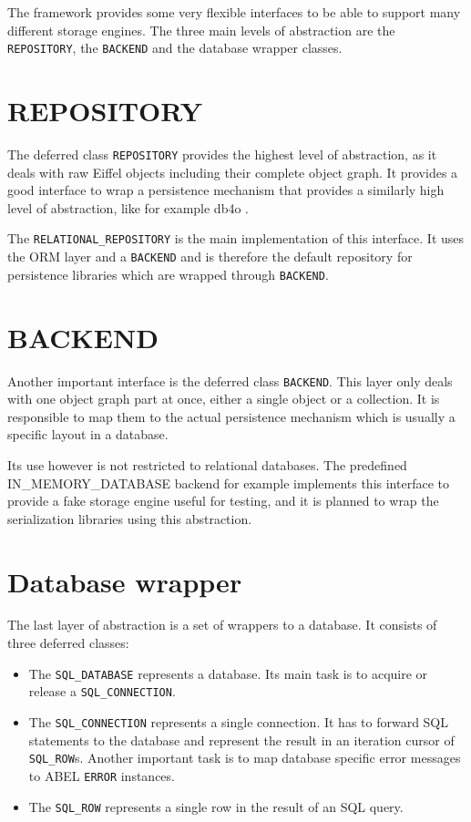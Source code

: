 \documentclass[a4paper,12pt]{report}
\begin{document}
The framework provides some very flexible interfaces to be able to support many different storage engines. 
The three main levels of abstraction are the \lstinline!REPOSITORY!, the \lstinline!BACKEND! and the database wrapper classes.

\section{REPOSITORY}

The deferred class \lstinline!REPOSITORY! provides the highest level of abstraction, as it deals with raw Eiffel objects including their complete object graph.
It provides a good interface to wrap a persistence mechanism that provides a similarly high level of abstraction, like for example db4o \cite{db4o}.

The \lstinline!RELATIONAL_REPOSITORY! is the main implementation of this interface.
It uses the ORM layer and a \lstinline!BACKEND! and is therefore the default repository for persistence libraries which are wrapped through \lstinline!BACKEND!.

\section{BACKEND}

Another important interface is the deferred class \lstinline!BACKEND!.
This layer only deals with one object graph part at once, either a single object or a collection.
It is responsible to map them to the actual persistence mechanism which is usually a specific layout in a database.

Its use however is not restricted to relational databases.
The predefined IN\_MEMORY\_DATABASE backend for example implements this interface to provide a fake storage engine useful for testing, and it is planned to wrap the serialization libraries using this abstraction.

\section{Database wrapper}


The last layer of abstraction is a set of wrappers to a database. 
It consists of three deferred classes: 
\begin{itemize}
 \item The \lstinline!SQL_DATABASE! represents a database. Its main task is to acquire or release a \lstinline!SQL_CONNECTION!.
 \item The \lstinline!SQL_CONNECTION! represents a single connection. 
It has to forward SQL statements to the database and represent the result in an iteration cursor of \lstinline!SQL_ROW!s.
Another important task is to map database specific error messages to ABEL \lstinline!ERROR! instances.
  \item The \lstinline!SQL_ROW! represents a single row in the result of an SQL query.
\end{itemize}
\end{document}
